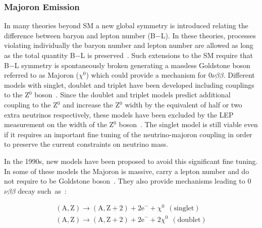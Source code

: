 \documentclass[main.tex]{subfiles}
\begin{document}
\FloatBarrier


\subsubsection{Majoron Emission}


\NI In many theories beyond SM a new global symmetry is introduced relating the difference between baryon and lepton number (B$-$L). In these theories, processes violating individually the baryon number and lepton number are allowed as long as the total quantity B$-$L is preserved~\cite{B-L-Interaction}. Such extensions to the SM require that B$-$L symmetry is spontaneously broken generating a massless Goldstone boson referred to as Majoron ($\chi^\text{0}$) which could provide a mechanism for 0$\nu\beta\beta$. Different models with singlet, doublet and triplet have been developed including couplings to the Z$^\text{0}$ boson~\cite{MajoronEmission1,MajoronEmission2,MajoronEmission3}. Since the doublet and triplet models predict additional coupling to the Z$^\text{0}$ and increase the Z$^\text{0}$ width by the equivalent of half or two extra neutrinos respectively, these models have been excluded by the LEP measurement on the width of the Z$^\text{0}$ boson~\cite{ALEPH3neutrino}. The singlet model is still viable even if it requires an important fine tuning of the neutrino-majoron coupling in order to preserve the current constraints on neutrino mass.


\bigskip


\NI In the 1990s, new models have been proposed to avoid this significant fine tuning. In some of these models the Majoron is massive, carry a lepton number and do not require to be Goldstone boson~\cite{MajoronDecayMode}. They also provide mechanisms leading to 0$\nu\beta\beta$ decay such~as~:


\begin{equation}
\begin{split}
(\text{A},\text{Z}) \rightarrow (\text{A},\text{Z}+\text{2}) + \text{2e}^- + \chi^{\text{0}}~~(\text{singlet}) \\[0.1cm]
(\text{A},\text{Z}) \rightarrow (\text{A},\text{Z}+\text{2}) + \text{2e}^- + \text{2}\chi^{\text{0}}~~(\text{doublet})
\end{split}
\end{equation}


\bigskip




\end{document}
